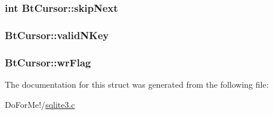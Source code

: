 \hypertarget{struct_bt_cursor_ab1dfdbd6c9ec6cdb21cdb5deaa6d5ecb}{
\subsubsection[{skip\-Next}]{\setlength{\rightskip}{0pt plus 5cm}int Bt\-Cursor\-::skip\-Next}}\label{struct_bt_cursor_ab1dfdbd6c9ec6cdb21cdb5deaa6d5ecb}
\hypertarget{struct_bt_cursor_a7b64ef18751d3076484903e9e9e05098}{
\subsubsection[{valid\-N\-Key}]{ Bt\-Cursor\-::valid\-N\-Key}}\label{struct_bt_cursor_a7b64ef18751d3076484903e9e9e05098}
\hypertarget{struct_bt_cursor_a9482c52d8c85519a3ada18517bf67a47}{
\subsubsection[{wr\-Flag}]{ Bt\-Cursor\-::wr\-Flag}}\label{struct_bt_cursor_a9482c52d8c85519a3ada18517bf67a47}


The documentation for this struct was generated from the following file\-:\begin{DoxyCompactItemize}
\item 
Do\-For\-Me!/\hyperlink{sqlite3_8c}{sqlite3.\-c}\end{DoxyCompactItemize}
